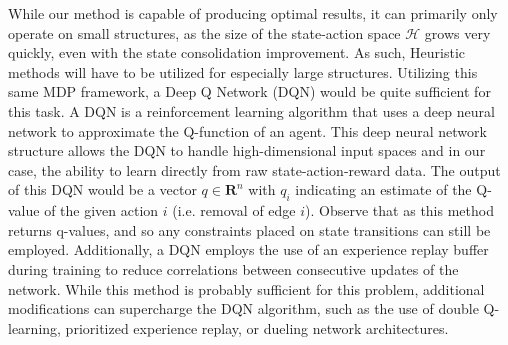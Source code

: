 \documentclass{article}
\begin{document}
While our method is capable of producing optimal results, it can primarily only operate on small structures, as the size of the state-action space $\mathcal{H}$ grows very quickly, even with the state consolidation improvement. As such, Heuristic methods will have to be utilized for especially large structures. Utilizing this same MDP framework, a Deep Q Network (DQN) would be quite sufficient for this task. A DQN is a reinforcement learning algorithm that uses a deep neural network to approximate the Q-function of an agent. This deep neural network structure allows the DQN to handle high-dimensional input spaces and in our case, the ability to learn directly from raw state-action-reward data. The output of this DQN would be a vector $q \in \mathbf{R}^n$ with $q_i$ indicating an estimate of the Q-value of the given action $i$ (i.e. removal of edge $i$). Observe that as this method returns q-values, and so any constraints placed on state transitions can still be employed. Additionally, a DQN employs the use of an experience replay buffer during training to reduce correlations between consecutive updates of the network. While this method is probably sufficient for this problem, additional modifications can supercharge the DQN algorithm, such as the use of double Q-learning, prioritized experience replay, or dueling network architectures.



\clearpage


\end{document}
